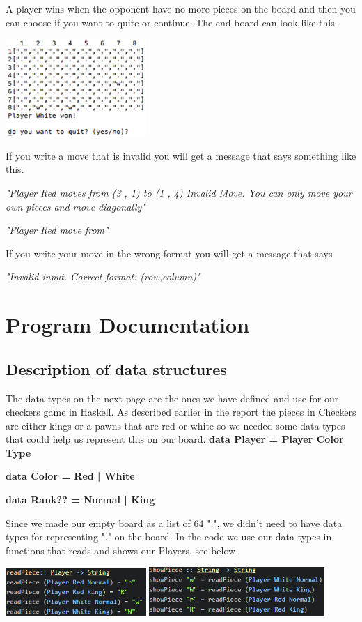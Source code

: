 \documentclass[12pt,a4paper]{article}
\begin{document}
A player wins when the opponent have no more pieces on the board and then you can choose if you want to quite or continue. The end board can look like this.

\begin{center}
	\includegraphics[width= 0.4\textwidth]{victory.PNG}
\end{center}

If you write a move that is invalid you will get a message that says something like this.

\textit{"Player Red moves from (3 , 1) to (1 , 4)
Invalid Move. You can only move your own pieces and move diagonally"}

\textit{"Player Red move from"}

If you write your move in the wrong format you will get a message that says 

\textit{"Invalid input. Correct format: (row,column)"}




\section{Program Documentation}
\subsection{Description of data structures}
The data types on the next page are the ones we have defined and use for our checkers game in Haskell. As described earlier in the report the pieces in Checkers are either kings or a pawns that are red or white so we needed some data types that could help us represent this on our board.
\newpage\textbf{data Player = Player Color Type}

\textbf{data Color = Red | White}

\textbf{data Rank?? = Normal | King}

Since we made our empty board as a list of 64 ".", we didn't need to have data types for representing "." on the board. In the code we use our data types in functions that reads and shows our Players, see below. 


\includegraphics[width= 0.4\textwidth]{read.PNG}  \includegraphics[width= 0.5\textwidth]{show.PNG}
\end{document}
